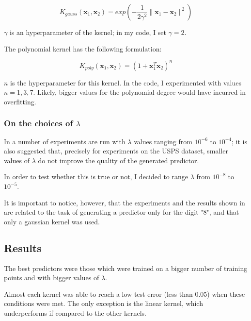 \documentclass[a4paper]{article}
\begin{document}
\begin{equation}
K_{gauss} (\mathbf{x}_1, \mathbf{x}_2) = exp(-\frac{1}{2 \gamma^2} \parallel \mathbf{x}_1 - \mathbf{x}_2 \parallel^2)
\end{equation}

\(\gamma\) is an hyperparameter of the kernel; in my code, I set \(\gamma = 2\).

The polynomial kernel has the following formulation:

\begin{equation}
K_{poly} (\mathbf{x}_1, \mathbf{x}_2) = (1 + \mathbf{x}_1^T \mathbf{x}_2) ^ n
\end{equation}

\(n\) is the hyperparameter for this kernel. In the code, I experimented with values \(n = 1,3,7\). Likely, bigger values for the polynomial degree would have incurred in overfitting.

\subsubsection{On the choices of \(\lambda\)}
\label{sec:org1b28bd7}
\label{org9c98173}

In \cite{pegasos} a number of experiments are run with \(\lambda\) values ranging from \(10^{-6}\) to \(10^{-4}\); it is also suggested that, precisely for experiments on the USPS dataset, smaller values of \(\lambda\) do not improve the quality of the generated predictor.

In order to test whether this is true or not, I decided to range \(\lambda\) from \(10^{-8}\) to \(10^{-5}\).

It is important to notice, however, that the experiments and the results shown in \cite{@pegasos} are related to the task of generating a predictor only for the digit "8", and that only a gaussian kernel was used. 

\subsection{Results}
\label{sec:org861d94c}

The best predictors were those which were trained on a bigger number of training points and with bigger values of \(\lambda\).

Almost each kernel was able to reach a low test error (less than \(0.05\)) when these conditions were met. The only exception is the linear kernel, which underperforms if compared to the other kernels.
\end{document}

